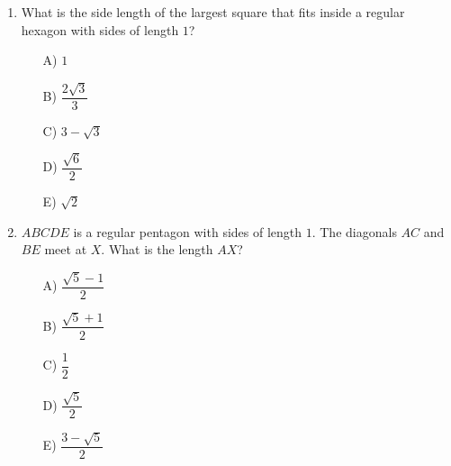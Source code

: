 \documentclass[11pt,a4paper]{article}
\begin{document}
\begin{enumerate}
\item What is the side length of the largest square that fits inside a regular hexagon with sides of length $1$?
\begin{itemize}
\item[A)] $1$
\item[B)] $\dfrac{2\sqrt3}{3}$
\item[C)] $3-\sqrt3$
\item[D)] $\dfrac{\sqrt6}{2}$
\item[E)] $\sqrt2$
\end{itemize}

\item \begin{minipage}[t]{0.60\linewidth}
$ABCDE$ is a regular pentagon with sides of length $1$. The diagonals $AC$ and $BE$ meet at $X$. What is the length $AX$?
\begin{itemize}[itemsep=3pt]
\item[A)] $\dfrac{\sqrt5-1}{2}$
\item[B)] $\dfrac{\sqrt5+1}{2}$
\item[C)] $\dfrac12$
\item[D)] $\dfrac{\sqrt5}{2}$
\item[E)] $\dfrac{3-\sqrt5}{2}$
\end{itemize}
\end{minipage}\hfill
\begin{minipage}[t]{0.36\linewidth}
\vspace{0pt}
\centering
{}
\end{minipage}


\end{enumerate}
\end{document}
